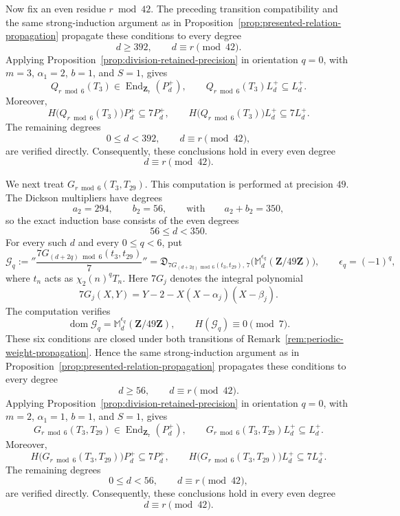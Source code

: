 \documentclass[11pt]{article}
\newcommand{\End}{\operatorname{End}}
\theoremstyle{plain}
\theoremstyle{definition}
\theoremstyle{remark}
\numberwithin{equation}{section}
\begin{document}
Now fix an even residue \(r\bmod42\). The preceding transition compatibility and the same strong-induction argument as in Proposition~\ref{prop:presented-relation-propagation} propagate these conditions to every degree \[ d\geq392, \qquad d\equiv r\pmod{42}. \] Applying Proposition~\ref{prop:division-retained-precision} in orientation \(q=0\), with \(m=3\), \(\alpha_1=2\), \(b=1\), and \(S=1\), gives \[ Q_{r\bmod6}(T_3)\in\End_{\mathbf Z_7}(P_d^+), \qquad Q_{r\bmod6}(T_3)L_d^+\subseteq L_d^+. \] Moreover, \begin{equation} H\bigl(Q_{r\bmod6}(T_3)\bigr)P_d^+ \subseteq7P_d^+, \qquad H\bigl(Q_{r\bmod6}(T_3)\bigr)L_d^+ \subseteq7L_d^+. \label{eq:p7-Q-relations} \end{equation} The remaining degrees \[ 0\leq d<392, \qquad d\equiv r\pmod{42}, \] are verified directly. Consequently, these conclusions hold in every even degree \[ d\equiv r\pmod{42}. \]

We next treat \(G_{r\bmod6}(T_3,T_{29})\).  This computation is performed at precision \(49\).  The Dickson multipliers have degrees \[ a_2=294,\qquad b_2=56, \qquad\mbox{with}\qquad a_2+b_2=350, \] so the exact induction base consists of the even degrees \[ 56\leq d<350. \] For every such \(d\) and every \(0\leq q<6\), put \[ \mathcal G_q:= ''\frac{7G_{(d+2q)\bmod 6}(t_3, t_{29})}{7}'' = \mathfrak D_{7G_{(d+2q)\bmod6}(t_3,t_{29}),\,7} \bigl(\mathbb M_d^{\epsilon_q}(\mathbf Z/49\mathbf Z)\bigr), \qquad \epsilon_q=(-1)^q, \] where \(t_n\) acts as \(\chi_2(n)^qT_n\). Here \(7G_j\) denotes the integral polynomial \[ 7G_j(X,Y)=Y-2-X(X-\alpha_j)(X-\beta_j). \] The computation verifies \[ \operatorname{dom}\mathcal G_q =\mathbb M_d^{\epsilon_q}(\mathbf Z/49\mathbf Z), \qquad H(\mathcal G_q)\equiv0\pmod7. \] These six conditions are closed under both transitions of Remark~\ref{rem:periodic-weight-propagation}. Hence the same strong-induction argument as in Proposition~\ref{prop:presented-relation-propagation} propagates these conditions to every degree \[ d\geq56, \qquad d\equiv r\pmod{42}. \] Applying Proposition~\ref{prop:division-retained-precision}
in orientation \(q=0\), with \(m=2\), \(\alpha_1=1\), \(b=1\), and \(S=1\), gives \[ G_{r\bmod6}(T_3,T_{29}) \in\End_{\mathbf Z_7}(P_d^+), \qquad G_{r\bmod6}(T_3,T_{29})L_d^+\subseteq L_d^+. \] Moreover, \begin{equation} H\bigl(G_{r\bmod6}(T_3,T_{29})\bigr)P_d^+ \subseteq7P_d^+, \qquad H\bigl(G_{r\bmod6}(T_3,T_{29})\bigr)L_d^+ \subseteq7L_d^+. \label{eq:p7-G-relations} \end{equation} The remaining degrees \[ 0\leq d<56, \qquad d\equiv r\pmod{42}, \] are verified directly. Consequently, these conclusions hold in every even degree \[ d\equiv r\pmod{42}. \]
\end{document}
